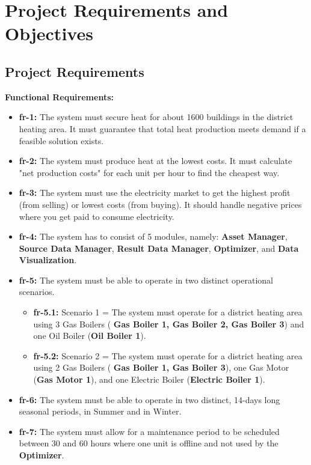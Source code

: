 
\section[Requirements and Objectives]{Project Requirements and Objectives}

\subsection{Project Requirements}
\textbf{Functional Requirements:}
\begin{itemize}
    \item \textbf{\acrshort{fr}-1:} The system must secure heat for about 1600 buildings in the district heating area.
    It must guarantee that total heat production meets demand if a feasible solution exists.
    \item \textbf{\acrshort{fr}-2:} The system must produce heat at the lowest costs. It must calculate "net production costs"
    for each unit per hour to find the cheapest way.
    \item \textbf{\acrshort{fr}-3:} The system must use the electricity market to get the highest profit (from selling) or lowest costs (from buying).
    It should handle negative prices where you get paid to consume electricity.
    \item \textbf{\acrshort{fr}-4:} The system has to consist of 5 modules, namely: \textbf{Asset Manager}, \textbf{Source Data Manager},
    \textbf{Result Data Manager}, \textbf{Optimizer}, and \textbf{Data Visualization}.
    \item \textbf{\acrshort{fr}-5:} The system must be able to operate in two distinct operational scenarios.
        \begin{itemize}[label=\textbullet]
            \item \textbf{\acrshort{fr}-5.1:} Scenario 1 = The system must operate for a district heating area using 3 Gas Boilers (\textbf{
            Gas Boiler 1, Gas Boiler 2, Gas Boiler 3}) and one Oil Boiler (\textbf{Oil Boiler 1}).
            \item \textbf{\acrshort{fr}-5.2:} Scenario 2 = The system must operate for a district heating area using 2 Gas Boilers (\textbf{
            Gas Boiler 1, Gas Boiler 3}), one Gas Motor (\textbf{Gas Motor 1}), and one Electric Boiler (\textbf{Electric Boiler 1}).
        \end{itemize}
    \item \textbf{\acrshort{fr}-6:} The system must be able to operate in two distinct, 14-days long seasonal periods, in Summer and in Winter.
    \item \textbf{\acrshort{fr}-7:} The system must allow for a maintenance period to be scheduled between 30 and 60 hours where one unit is
    offline and not used by the \textbf{Optimizer}.
\end{itemize}

